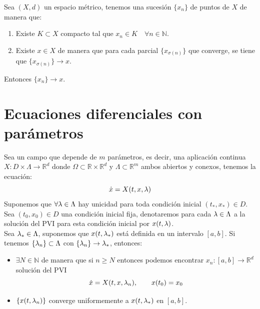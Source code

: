 \documentclass[12pt]{book}
\begin{document}
\begin{lema}
    Sea $(X,d)$ un espacio métrico, tenemos una sucesión $\{x_n\}$ de puntos de $X$ de manera que:
    \begin{enumerate}
        \item Existe $K\subset X$ compacto tal que $x_n\in K\quad \forall n\in \mathbb{N}$.
        \item Existe $x\in X$ de manera que para cada parcial $\{x_{\sigma(n)}\}$ que converge, se tiene que $\{x_{\sigma(n)}\} \to x$.
    \end{enumerate}
    Entonces $\{x_n\}\to x$.
\end{lema}

\section{Ecuaciones diferenciales con parámetros}\label{sec:dep_parametros}

\begin{teo}
    Sea un campo que depende de $m$ parámetros, es decir, una aplicación continua $X:D\times\Lambda\to \mathbb{R}^d$ donde $\Omega\subset\mathbb{R}\times\mathbb{R}^d$ y $\Lambda\subset\mathbb{R}^m$ ambos abiertos y conexos, tenemos la ecuación:
    \begin{equation*}
        \dot{x} = X(t,x,\lambda)
    \end{equation*}
    Suponemos que $\forall \lambda\in \Lambda$ hay unicidad para toda condición inicial $(t_\ast,x_\ast)\in D$.\\

    \noindent
    Sea $(t_0,x_0)\in D$ una condición inicial fija, denotaremos para cada $\lambda\in \Lambda$ a la solución del PVI para esta condición inicial por $x(t,\lambda)$.\\

    \noindent
    Sea $\lambda_\ast\in \Lambda$, suponemos que $x(t,\lambda_\ast)$ está definida en un intervalo $[a,b]$. Si tenemos $\{\lambda_n\}\subset\Lambda$ con $\{\lambda_n\}\to \lambda_\ast$, entonces:
    \begin{itemize}
        \item $\exists N\in \mathbb{N}$ de manera que si $n\geq N$ entonces podemos encontrar $x_n:[a,b]\to \mathbb{R}^d$ solución del PVI
            \begin{equation*}
                \dot{x}= X(t,x,\lambda_n), \qquad x(t_0) = x_0
            \end{equation*}
        \item $\{x(t,\lambda_n)\}$ converge uniformemente a $x(t,\lambda_\ast)$ en $[a,b]$.
    \end{itemize}
\end{teo}
\end{document}
